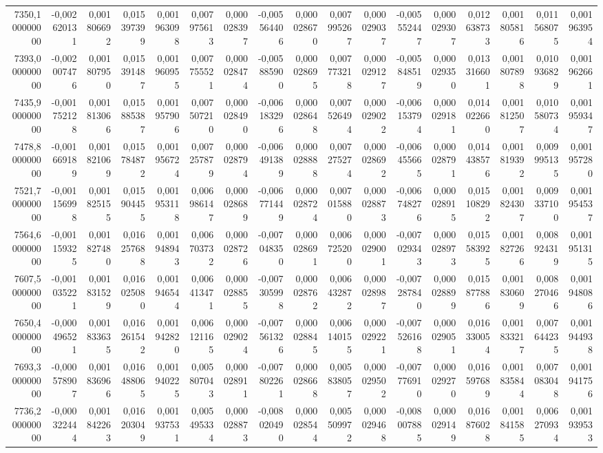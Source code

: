 \begin{longtable}{rrrrrrrrrrrrrrrrr}
7350,100000000 & -0,002620131 & 0,001806692 & 0,015397399 & 0,001963098 & 0,007975613 & 0,000028397 & -0,005564406 & 0,000028670 & 0,007995267 & 0,000029037 & -0,005552447 & 0,000029307 & 0,012638733 & 0,001805816 & 0,011568075 & 0,001963954\\
7393,000000000 & -0,002007476 & 0,001807950 & 0,015391487 & 0,001960955 & 0,007755521 & 0,000028474 & -0,005885900 & 0,000028695 & 0,007773218 & 0,000029127 & -0,005848519 & 0,000029350 & 0,013316601 & 0,001807898 & 0,010936829 & 0,001962661\\
7435,900000000 & -0,001752128 & 0,001813066 & 0,015885387 & 0,001957906 & 0,007507210 & 0,000028490 & -0,006183296 & 0,000028648 & 0,007526494 & 0,000029022 & -0,006153794 & 0,000029181 & 0,014022660 & 0,001812507 & 0,010580734 & 0,001959347\\
7478,800000000 & -0,001669189 & 0,001821069 & 0,015784872 & 0,001956724 & 0,007257879 & 0,000028794 & -0,006491389 & 0,000028888 & 0,007275274 & 0,000028692 & -0,006455665 & 0,000028791 & 0,014438576 & 0,001819392 & 0,009995135 & 0,001957280\\
7521,700000000 & -0,001156998 & 0,001825155 & 0,015904455 & 0,001953118 & 0,006986147 & 0,000028689 & -0,006771449 & 0,000028724 & 0,007015880 & 0,000028873 & -0,006748276 & 0,000028915 & 0,015108292 & 0,001824307 & 0,009337100 & 0,001954537\\
7564,600000000 & -0,001159325 & 0,001827480 & 0,016257688 & 0,001948943 & 0,006703732 & 0,000028726 & -0,007048350 & 0,000028691 & 0,006725200 & 0,000029001 & -0,007029343 & 0,000028973 & 0,015583925 & 0,001827266 & 0,008924319 & 0,001951315\\
7607,500000000 & -0,001035221 & 0,001831529 & 0,016025080 & 0,001946544 & 0,006413471 & 0,000028855 & -0,007305998 & 0,000028762 & 0,006432872 & 0,000028987 & -0,007287840 & 0,000028899 & 0,015877886 & 0,001830609 & 0,008270466 & 0,001948086\\
7650,400000000 & -0,000496521 & 0,001833635 & 0,016261542 & 0,001942820 & 0,006121165 & 0,000029024 & -0,007561326 & 0,000028845 & 0,006140155 & 0,000029221 & -0,007526168 & 0,000029051 & 0,016330054 & 0,001833217 & 0,007644235 & 0,001944938\\
7693,300000000 & -0,000578907 & 0,001836966 & 0,016488065 & 0,001940225 & 0,005807043 & 0,000028911 & -0,007802261 & 0,000028668 & 0,005838057 & 0,000029502 & -0,007776910 & 0,000029270 & 0,016597689 & 0,001835844 & 0,007083048 & 0,001941756\\
7736,200000000 & -0,000322444 & 0,001842263 & 0,016203049 & 0,001937531 & 0,005495334 & 0,000028873 & -0,008020490 & 0,000028544 & 0,005509972 & 0,000029468 & -0,008007885 & 0,000029149 & 0,016876028 & 0,001841585 & 0,006270934 & 0,001939533\\

\end{longtable}
